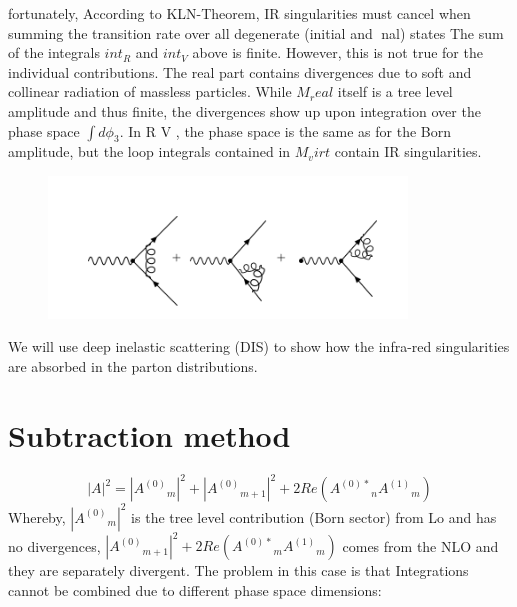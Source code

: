 fortunately, According to KLN-Theorem, IR singularities must cancel when summing the transition
rate over all degenerate (initial and nal) states
The sum of the integrals $ int_R $ and $ int_V $ above is finite. However, this is not true for the
individual contributions. The real part contains divergences due to soft and collinear
radiation of massless particles. While $ M_real $ itself is a tree level amplitude and thus
finite, the divergences show up upon integration over the phase space $ \int d \phi_3 $. In
R
V , the
phase space is the same as for the Born amplitude, but the loop integrals contained in
$ M_virt $ contain IR singularities.
\begin{figure}[ht!]
\centering
\includegraphics[width=0.85\textwidth]{images/Intro/virtual.png}
\end{figure}
We will use deep inelastic scattering (DIS) to show how the infra-red singularities are absorbed in the parton distributions.

\section{Subtraction method}
\begin{equation}
|A|^2 = |{A^{(0)}}_m|^2 +  |{A^{(0)}}_{m+1}|^2+ 2Re({A^{(0)*}}_{n}{A^{(1)}}_{m})
\end{equation}
Whereby, $ |{A^{(0)}}_m|^2 $ is the tree level contribution (Born sector) from Lo and has no divergences, $ |{A^{(0)}}_{m+1}|^2+ 2Re({A^{(0)*}}_{m}{A^{(1)}}_{m}) $ comes from the NLO and they are separately divergent. The problem in this case is that Integrations cannot be combined due to different phase space dimensions:

